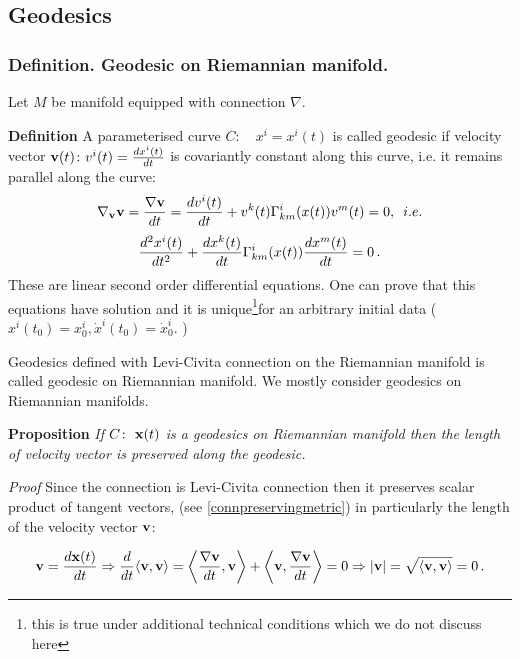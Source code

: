 \documentclass[12pt]{article}
\theoremstyle{theorem}
\numberwithin{equation}{section}
\begin{document}
{\subsection {Geodesics}

\subsubsection {Definition.  Geodesic on Riemannian manifold.}

Let $M$ be manifold equipped with connection $\nabla$.

{\bf Definition} A parameterised curve  $C\colon\quad x^i=x^i(t)$ is called geodesic if velocity vector
${\bf v}(t)\colon v^i(t)={dx^i(t)\over dt}$ is covariantly constant along this curve, i.e.
it remains parallel along the curve:
\begin{equation}\label{geodesdef1}
    \nabla_{\bf v} {\bf v}={\nabla{\bf v}\over dt}={dv^i(t)\over dt}+v^k(t)\Gamma^i_{km}(x(t))v^m(t)=0,\,\,\,{i.e.}
\end{equation}
\begin{equation*}
    {d^2x^i(t)\over dt^2}+{d x^k(t)\over dt}\Gamma^i_{km}(x(t)){d x^m(t)\over dt}=0\,.
\end{equation*}
  These are linear second order differential equations. One can prove that
  this equations have solution and it is unique\footnote{this is true under additional technical conditions which we do not
  discuss here}for an arbitrary initial data
  ($x^i(t_0)=x^i_0, \dot x^i(t_0)=\dot x^i_0$. )


\m

Geodesics defined with Levi-Civita connection on the Riemannian manifold is called geodesic on Riemannian manifold.
We mostly consider geodesics on Riemannian manifolds.


{\bf Proposition}   {\it If $C \colon\,\, {\bf x}(t)$ is a geodesics on Riemannian manifold then the length of
velocity vector is preserved along the geodesic.}


{\sl Proof}   Since the connection is Levi-Civita connection then it preserves scalar product of tangent vectors,
(see \eqref{connpreservingmetric}) in particularly the length of the velocity vector ${\bf v}$:

\begin{equation}\label{preservationofthelength}
  {\bf v}={d{\bf x}(t)\over dt}\Rightarrow {d\over dt}\langle{\bf v},{\bf v}\rangle=
  \left\langle{\nabla{\bf v}\over dt},{\bf v}\right\rangle+\left\langle{\bf v},{\nabla{\bf v}\over dt}\right\rangle=0\Rightarrow
  |{\bf v}|=\sqrt {\langle{\bf v},{\bf v}\rangle}=0\,.
\end{equation}

}
\end{document}

